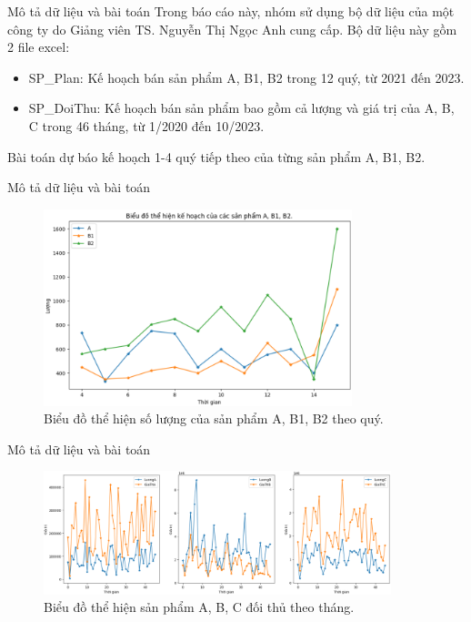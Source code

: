 \begin{frame}{Mô tả dữ liệu và bài toán}
    Trong báo cáo này, nhóm sử dụng bộ dữ liệu của một công ty do Giảng viên TS. Nguyễn Thị Ngọc Anh cung cấp. Bộ dữ liệu này gồm 2 file excel:
\begin{itemize}
    \item SP\_Plan: Kế hoạch bán sản phẩm A, B1, B2 trong 12 quý, từ 2021 đến 2023.
    \item SP\_DoiThu: Kế hoạch bán sản phẩm bao gồm cả lượng và giá trị của A, B, C trong 46 tháng, từ 1/2020 đến 10/2023.
\end{itemize}

Bài toán dự báo kế hoạch 1-4 quý tiếp theo của từng sản phẩm A, B1, B2.
    
\end{frame}

\begin{frame}{Mô tả dữ liệu và bài toán}
    \begin{figure}[H]
    \centering
    \includegraphics[width = 0.8\textwidth]{figure/AB1B2.png}
    \caption{Biểu đồ thể hiện số lượng của sản phẩm A, B1, B2 theo quý.}
    \label{fig:AB1B2}
\end{figure}
\end{frame}

\begin{frame}{Mô tả dữ liệu và bài toán}
    \begin{figure}[H]
    \centering
    \includegraphics[width = 0.9\textwidth]{figure/ABCGiaTriLuong.PNG}
    \caption{Biểu đồ thể hiện sản phẩm A, B, C đối thủ theo tháng.}
    \label{fig:ABCGiaTriLuong}
\end{figure}
\end{frame}

